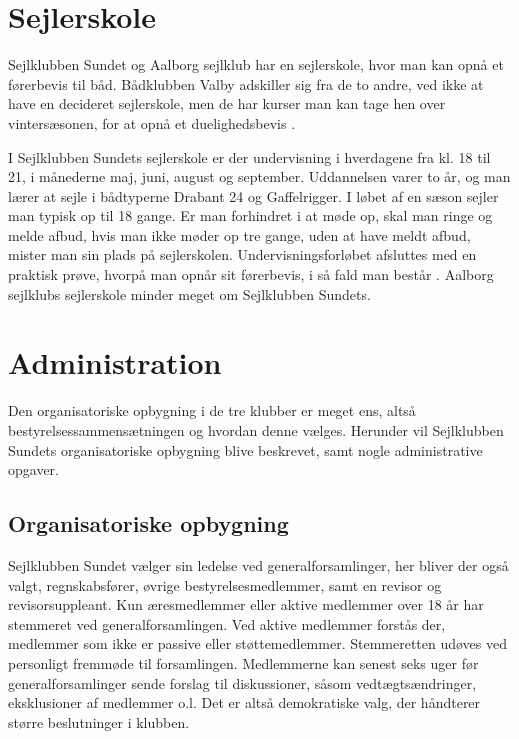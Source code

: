 \section{Sejlerskole}\label{sec:sejlerskole}

Sejlklubben Sundet og Aalborg sejlklub har en sejlerskole, hvor man kan opnå et førerbevis til båd. Bådklubben
Valby adskiller sig fra de to andre, ved ikke at have en decideret sejlerskole, men de har kurser man kan
tage hen over vintersæsonen, for at opnå et duelighedsbevis \citep{baedklubben_valby_duelighedsbevis}.

I Sejlklubben Sundets sejlerskole er der undervisning i hverdagene fra kl. 18 til 21, i månederne
maj, juni, august og september. Uddannelsen varer to år, og man lærer at sejle i bådtyperne Drabant 24 og
Gaffelrigger. I løbet af en sæson sejler man typisk op til 18 gange. Er man forhindret i at møde op, skal man
ringe og melde afbud, hvis man ikke møder op tre gange, uden at have meldt afbud, mister man sin plads på
sejlerskolen. Undervisningsforløbet afsluttes med en praktisk prøve, hvorpå man opnår sit førerbevis, i så
fald man består \citep{Sundet}. Aalborg sejlklubs sejlerskole minder meget om Sejlklubben Sundets.


\section{Administration}\label{sec:organisatoriske-opbygning}

Den organisatoriske opbygning i de tre klubber er meget ens, altså bestyrelsessammensætningen og hvordan denne
vælges. Herunder vil Sejlklubben Sundets organisatoriske opbygning blive beskrevet, samt nogle administrative
opgaver.


\subsection{Organisatoriske opbygning}\label{subsec:organisatoriske-opbygning}

Sejlklubben Sundet vælger sin ledelse ved generalforsamlinger, her bliver der også valgt, regnskabsfører,
øvrige bestyrelsesmedlemmer, samt en revisor og revisorsuppleant. Kun æresmedlemmer eller aktive medlemmer
over 18 år har stemmeret ved generalforsamlingen. Ved aktive medlemmer forstås der, medlemmer som ikke er
passive eller støttemedlemmer. Stemmeretten udøves ved personligt fremmøde til forsamlingen. Medlemmerne kan
senest seks uger før generalforsamlinger sende forslag til diskussioner, såsom vedtægtsændringer, eksklusioner
af medlemmer o.l. Det er altså demokratiske valg, der håndterer større beslutninger i klubben.


